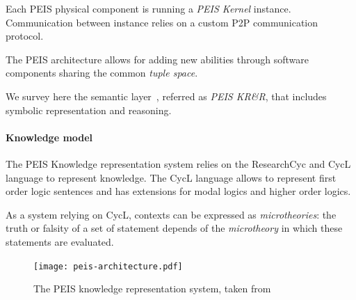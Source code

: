 \documentclass[a4paper, twocolumn]{article}
\begin{document}
Each PEIS physical component is running a \emph{PEIS Kernel} instance. Communication
between instance relies on a custom P2P communication protocol.

The PEIS architecture allows for adding new abilities through software components sharing the common \emph{tuple space}.

We survey here the semantic layer~\cite{Daoutis2009}, referred as \emph{PEIS KR\&R}, that includes symbolic representation and reasoning.


\paragraph{Knowledge model} The PEIS Knowledge representation system relies on
the {\sc ResearchCyc} and {\sc CycL} language to represent knowledge. The {\sc CycL} language
allows to represent first order logic sentences and has extensions for modal logics and higher order logics.


As a system relying on {\sc CycL}, contexts can be expressed as
\emph{microtheories}: the truth or falsity of a set of statement depends of the
\emph{microtheory} in which these statements are evaluated.


\begin{figure}
	\centering
	\texttt{[image: peis-architecture.pdf]}
	\caption{The PEIS knowledge representation system, taken from~\cite{Daoutis2009}}
	\label{fig|peis-archi}
\end{figure}
\end{document}
